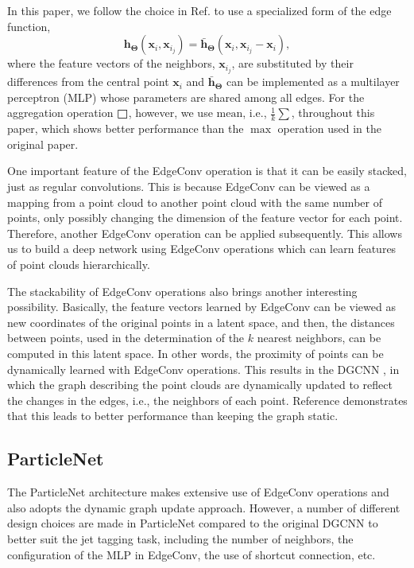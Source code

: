 \documentclass[aps,prd,longbibliography,reprint,amsmath,amssymb,amsfonts]{revtex4-1}
\begin{document}
In this paper, we follow the choice in Ref. \cite{DBLP:journals/corr/abs-1801-07829} to use a specialized form of the edge function,
\begin{equation}
\bm{h}_{\boldsymbol{\Theta}}(\bm{x}_i, \bm{x}_{i_j}) = \bar{\bm{h}}_{\boldsymbol{\Theta}}(\bm{x}_i, \bm{x}_{i_j}-\bm{x}_i),
\label{eq:edge-func}
\end{equation}
where the feature vectors of the neighbors, $\bm{x}_{i_j}$, are substituted by their differences from the central point $\bm{x}_i$ and $\bar{\bm{h}}_{\boldsymbol{\Theta}}$ can be implemented as a  multilayer perceptron (MLP) whose parameters are shared among all edges. For the aggregation operation $\MedBox$, however, we use $\text{mean}$, i.e., $\frac{1}{k}\sum$, throughout this paper, which shows better performance than the $\max$ operation used in the original paper.

One important feature of the EdgeConv operation is that it can be easily stacked, just as regular convolutions. This is because EdgeConv can be viewed as a mapping from a point cloud to another point cloud with the same number of points, only possibly changing the dimension of the feature vector for each point. Therefore, another EdgeConv operation can be applied subsequently. This allows us to build a deep network using EdgeConv operations which can learn features of point clouds hierarchically.

The stackability of EdgeConv operations also brings another interesting possibility. Basically, the feature vectors learned by EdgeConv can be viewed as new coordinates of the original points in a latent space, and then, the distances between points, used in the determination of the $k$ nearest neighbors, can be computed in this latent space. In other words, the proximity of points can be dynamically learned with EdgeConv operations. This results in the DGCNN \cite{DBLP:journals/corr/abs-1801-07829}, in which the graph describing the point clouds are dynamically updated to reflect the changes in the edges, i.e., the neighbors of each point. Reference \cite{DBLP:journals/corr/abs-1801-07829} demonstrates that this leads to better performance than keeping the graph static.

\subsection{ParticleNet}

The ParticleNet architecture makes extensive use of EdgeConv operations and also adopts the dynamic graph update approach. However, a number of different design choices are made in ParticleNet compared to the original DGCNN to better suit the jet tagging task, including the number of neighbors, the configuration of the MLP in EdgeConv, the use of shortcut connection, etc.
\end{document}
